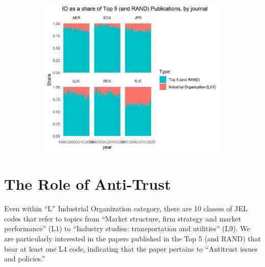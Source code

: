 \documentclass[11pt, letterpaper, twoside]{article}
\begin{document}
\begin{figure}
\begin{subfigure}[h]{0.49\textwidth}
        \includegraphics[width=\textwidth]{LXX-code-share-area-normalized-by-journal.png}
    \end{subfigure}
\end{figure}

\newpage

\section{The Role of Anti-Trust}
Even within ``L'' Industrial Organization category, there are 10 classes of JEL codes that refer to topics from ``Market structure, firm strategy and market performance'' (L1) to ``Industry studies: transportation and utilities'' (L9). We are particularly interested in the papers published in the Top 5 (and RAND) that bear at least one L4 code, indicating that the paper pertains to ``Antitrust issues and policies.''\\
\end{document}
